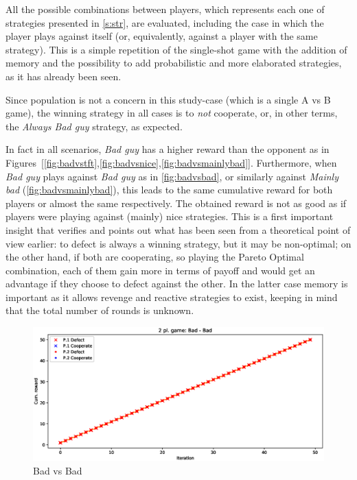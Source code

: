 \documentclass[journal,10pt,twoside]{IEEEtran}
\begin{document}
All the possible combinations between players, which represents each one of strategies presented in \autoref{s:str}, are evaluated, including the case in which the player plays against itself (or, equivalently, against a player with the same strategy).
This is a simple repetition of the single-shot game with the addition of memory and the possibility to add probabilistic and more elaborated strategies, as it has already been seen.

Since population is not a concern in this study-case (which is a single A vs B game), the winning strategy in all cases is to \textit{not} cooperate, or, in other terms, the \textit{Always Bad guy} strategy, as expected.

In fact in all scenarios, \textit{Bad guy} has a higher reward than the opponent as in Figures~[\ref{fig:badvstft},\ref{fig:badvsnice},\ref{fig:badvsmainlybad}]. 
Furthermore, when \textit{Bad guy} plays against \textit{Bad guy} as in \autoref{fig:badvsbad}, or similarly against \textit{Mainly bad} (\autoref{fig:badvsmainlybad}), this leads to the same cumulative reward for both players or almost the same respectively. The obtained reward is not as good as if players were playing against (mainly) nice strategies.
This is a first important insight that verifies and points out what has been seen from a theoretical point of view earlier: to defect is always a winning strategy, but it may be non-optimal; on the other hand, if both are cooperating, so playing the Pareto Optimal combination, each of them gain more in terms of payoff and would get an advantage if they choose to defect against the other. In the latter case memory is important as it allows revenge and reactive strategies to exist, keeping in mind that the total number of rounds is unknown. 

\begin{figure}[!ht]
    \centering
    \includegraphics[width=1\columnwidth]{../img/ipd2p/ipd2p-rewards-Bad-Bad}
    \caption{Bad vs Bad}
    \label{fig:badvsbad}
\end{figure}
\end{document}
